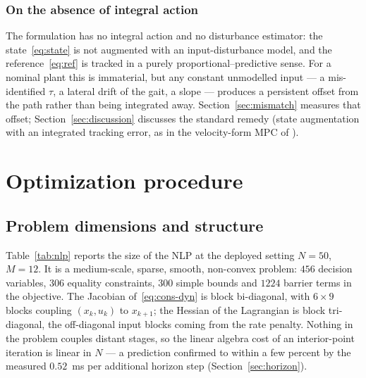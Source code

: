 \documentclass[11pt,a4paper]{article}
\begin{document}
\subsubsection{On the absence of integral action}
\label{sec:integral}

The formulation has no integral action and no disturbance estimator: the state~\eqref{eq:state} is not
augmented with an input-disturbance model, and the reference~\eqref{eq:ref} is tracked in a purely
proportional--predictive sense. For a nominal plant this is immaterial, but any constant unmodelled input ---
a mis-identified $\tau$, a lateral drift of the gait, a slope --- produces a persistent offset from the path
rather than being integrated away. Section~\ref{sec:mismatch} measures that offset; Section~\ref{sec:discussion}
discusses the standard remedy (state augmentation with an integrated tracking error, as in the
velocity-form MPC of \cite{rawlings2017mpc}).

\section{Optimization procedure}
\label{sec:optproc}

\subsection{Problem dimensions and structure}
\label{sec:dims}

Table~\ref{tab:nlp} reports the size of the NLP at the deployed setting $N=50$, $M=12$. It is a
medium-scale, sparse, smooth, non-convex problem: $456$ decision variables, $306$ equality constraints,
$300$ simple bounds and $1224$ barrier terms in the objective. The Jacobian of~\eqref{eq:cons-dyn} is block
bi-diagonal, with $6\times9$ blocks coupling $(x_k,u_k)$ to $x_{k+1}$; the Hessian of the Lagrangian is block
tri-diagonal, the off-diagonal input blocks coming from the rate penalty. Nothing in the problem couples
distant stages, so the linear algebra cost of an interior-point iteration is linear in $N$ --- a prediction
confirmed to within a few percent by the measured $0.52$~ms per additional horizon step
(Section~\ref{sec:horizon}).
\end{document}
